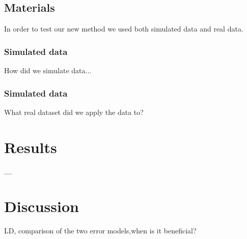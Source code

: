 \documentclass[a4paper, 11pt]{article}
\begin{document}
\begin{comment}
\begin{table}
\label{tab:cond_prob}
  \centering
  \begin{tabular}{|l|l|c|c|c|}
\hline
$G^{i2}_l$ & $G^{i1}_l$    & $X_l$=0 & $X_l$=1 & $X_l$=2\\
\hline
AA & AA & $(f^A_l)^2$ & $f^A_l$ & 1\\
AA & Aa & $(f^A_l)^2$ & $\frac{1}{2}f^A_l$ & 0\\
AA & aa & $(f^A_l)^2$ & 0 & 0\\
Aa & AA & $2f^A_lf^a_l$ & $f^a_l$ & 0\\
Aa & Aa & $2f^A_lf^a_l$ & $\frac{1}{2}f^A_l + \frac{1}{2}f^a_l$ & 1\\
Aa & aa & $2f^A_lf^a_l$ & $f^A_l$ & 0\\
aa & AA & $(f^a_l)^2$ & 0 & 0\\
aa & Aa & $(f^a_l)^2$ & $\frac{1}{2}f^a_l$ & 0\\
aa & aa & $(f^a_l)^2$ & $f^a_l$ & 1\\
\hline
  \end{tabular}
  \caption{Probabilities of observing the genotype $G^{i2}_l$ in individual $i2$ given that individual $i1$ has genotype $G^{i1}$, that $i1$ and $i2$ share $X_l$ alleles IBD and that the population frequency of allele A in locus $l$ is $f^A_l (=1-f^a_l)$.}
\end{table}
\end{comment}

\subsection*{Materials}
In order to test our new method we used both simulated data and real data.
\subsubsection*{Simulated data}
How did we simulate data...

\subsubsection*{Simulated data}
What real dataset did we apply the data to?

\section{Results}
....


\section{Discussion}
LD, comparison of the two error models,when is it beneficial? 
\end{document}
